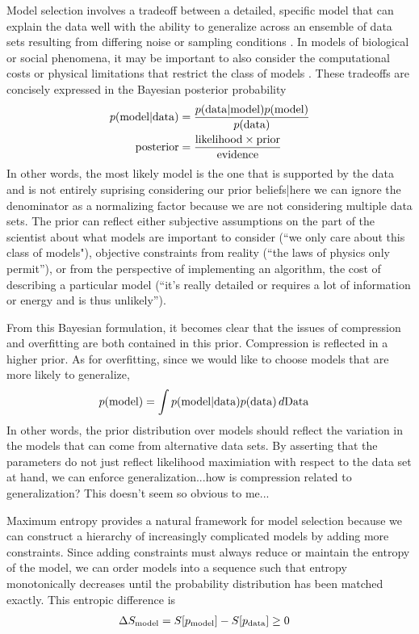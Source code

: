 \documentclass[aps,prl,twocolumn]{revtex4-1}
\begin{document}
Model selection involves a tradeoff between a detailed, specific model that can explain the data well with the ability to generalize across an ensemble of data sets resulting from differing noise or sampling conditions \cite{MacKay:2005wc}. In models of biological or social phenomena, it may be important to also consider the computational costs or physical limitations that restrict the class of models \cite{Daniels:1cq}. These tradeoffs are concisely expressed in the Bayesian posterior probability
\begin{align}
	p({\rm model}|{\rm data}) &= \frac{p({\rm data}|{\rm model})p({\rm model})}{p({\rm data})}\\
	{\rm posterior} &= \frac{{\rm likelihood}\times{\rm prior}}{{\rm evidence}}
\end{align}
In other words, the most likely model is the one that is supported by the data and is not entirely suprising considering our prior beliefs|here we can ignore the denominator as a normalizing factor because we are not considering multiple data sets. The prior can reflect either subjective assumptions on the part of the scientist about what models are important to consider (``we only care about this class of models"), objective constraints from reality (``the laws of physics only permit''), or from the perspective of implementing an algorithm, the cost of describing a particular model (``it's really detailed or requires a lot of information or energy and is thus unlikely''). 

From this Bayesian formulation, it becomes clear that the issues of compression and overfitting are both contained in this prior. Compression is reflected in a higher prior. As for overfitting, since we would like to choose models that are more likely to generalize,
\begin{align}
	p({\rm model}) &= \int p({\rm model}|{\rm data})p({\rm data})\,d{\rm Data}
\end{align}
In other words, the prior distribution over models should reflect the variation in the models that can come from alternative data sets. By asserting that the parameters do not just reflect likelihood maximiation with respect to the data set at hand, we can enforce generalization...how is compression related to generalization? This doesn't seem so obvious to me...

Maximum entropy provides a natural framework for model selection because we can construct a hierarchy of increasingly complicated models by adding more constraints. Since adding constraints must always reduce or maintain the entropy of the model, we can order models into a sequence such that entropy monotonically decreases until the probability distribution has been matched exactly. This entropic difference is
\begin{align}
	\Delta S_{\rm model} &= S[p_{\rm model}] - S[p_{\rm data}] \geq 0
\end{align}
\end{document}
